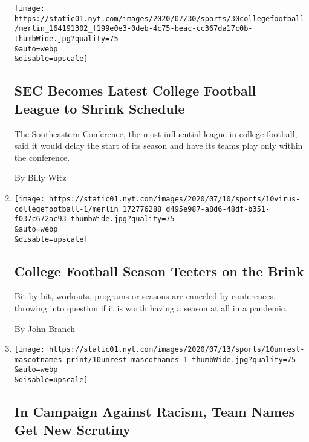 \begin{enumerate}
  \texttt{[image: https://static01.nyt.com/images/2020/07/30/sports/30collegefootball/merlin\_164191302\_f199e0e3-0deb-4c75-beac-cc367da17c0b-thumbWide.jpg?quality=75\\\&auto=webp\\\&disable=upscale]}

  \hypertarget{sec-becomes-latest-college-football-league-to-shrink-schedule}{%
  \subsection{SEC Becomes Latest College Football League to Shrink
  Schedule}\label{sec-becomes-latest-college-football-league-to-shrink-schedule}}

  The Southeastern Conference, the most influential league in college
  football, said it would delay the start of its season and have its
  teams play only within the conference.

  By Billy Witz
\item
  \href{/2020/07/10/sports/ncaafootball/coronavirus-college-football-season-canceled.html}{}

  \texttt{[image: https://static01.nyt.com/images/2020/07/10/sports/10virus-collegefootball-1/merlin\_172776288\_d495e987-a8d6-48df-b351-f037c672ac93-thumbWide.jpg?quality=75\\\&auto=webp\\\&disable=upscale]}

  \hypertarget{college-football-season-teeters-on-the-brink}{%
  \subsection{College Football Season Teeters on the
  Brink}\label{college-football-season-teeters-on-the-brink}}

  Bit by bit, workouts, programs or seasons are canceled by conferences,
  throwing into question if it is worth having a season at all in a
  pandemic.

  By John Branch
\item
  \href{/2020/07/10/sports/football/washington-redskins-name-change-mascots.html}{}

  \texttt{[image: https://static01.nyt.com/images/2020/07/13/sports/10unrest-mascotnames-print/10unrest-mascotnames-1-thumbWide.jpg?quality=75\\\&auto=webp\\\&disable=upscale]}

  \hypertarget{in-campaign-against-racism-team-names-get-new-scrutiny}{%
  \subsection{In Campaign Against Racism, Team Names Get New
  Scrutiny}\label{in-campaign-against-racism-team-names-get-new-scrutiny}}


\end{enumerate}
